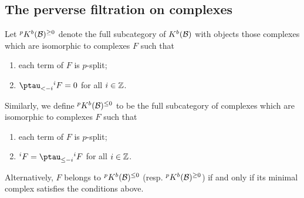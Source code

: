 \documentclass[11pt]{amsart}
\numberwithin{equation}{section}
\def\l{\lambda}
\newtheorem{lem}[thm]{Lemma}
\theoremstyle{definition}
\theoremstyle{remark}
\newtheorem{remark}[thm]{Remark}
\begin{document}
{%





\subsection{The perverse filtration on complexes}
Let ${}^p K^b({\mathcal{B}})^{\ge 0}$ denote the full subcategory of
$K^b({\mathcal{B}})$ with objects those complexes which are isomorphic to
complexes $F$ such that
\begin{enumerate}
\item each term of $F$ is $p$-split;
\item $\ptau_{<-i}{}^iF = 0$ for all $i\in {\mathbb{Z}}$.
\end{enumerate}
Similarly, we define ${}^p K^b({\mathcal{B}})^{\le 0}$ to be the full
subcategory of complexes which are isomorphic to complexes $F$ such that
\begin{enumerate}
\item each term of $F$ is $p$-split;
\item ${}^iF = \ptau_{\le -i}{}^iF$ for all $i \in {\mathbb{Z}}$.
\end{enumerate}
Alternatively, $F$ belongs to ${}^p K^b({\mathcal{B}})^{\le 0}$
(resp. ${}^p K^b({\mathcal{B}})^{\ge 0}$) if and only if its minimal complex
satisfies the conditions above.

}
\end{document}
